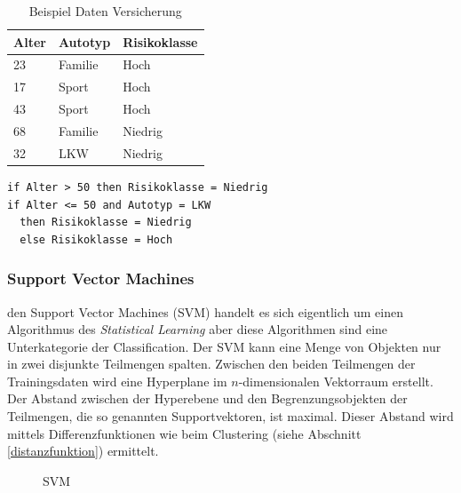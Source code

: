 \documentclass[12pt,journal,compsoc]{IEEEtran}
\begin{document}
\begin{table}[!t]
\caption{Beispiel Daten Versicherung}
\centering
\begin{tabular}{l|l|l}\hline
Alter	& Autotyp	& Risikoklasse \\\hline
23	& Familie	& Hoch\\
17	& Sport		& Hoch\\
43	& Sport		& Hoch\\
68	& Familie	& Niedrig\\
32	& LKW		& Niedrig
\end{tabular}
\label{trainingdata}
\end{table}
\begin{lstlisting}[caption={Entscheidungsbaum},label=dt,frame=single,floatplacement=t]
if Alter > 50 then Risikoklasse = Niedrig
if Alter <= 50 and Autotyp = LKW 
  then Risikoklasse = Niedrig
  else Risikoklasse = Hoch
\end{lstlisting}

\subsubsection{Support Vector Machines}
 den Support Vector Machines (SVM) handelt es sich eigentlich 
um einen Algorithmus des \emph{Statistical Learning} aber diese Algorithmen sind eine
Unterkategorie der Classification. Der SVM kann eine Menge von Objekten nur in zwei 
disjunkte Teilmengen spalten. Zwischen den beiden Teilmengen der Trainingsdaten wird 
eine Hyperplane im $n$-dimensionalen Vektorraum erstellt. Der Abstand zwischen der
Hyperebene und den Begrenzungsobjekten der Teilmengen, die so genannten Supportvektoren, 
ist maximal. Dieser Abstand wird mittels Differenzfunktionen wie beim Clustering 
(siehe Abschnitt \ref{distanzfunktion}) ermittelt.

\begin{figure}[!t]
\centering
\subfigure[Gesucht]{\scalebox{0.42}{}\label{hyperplane gesucht}}
\subfigure[Gefunden]{\scalebox{0.42}{}\label{hyperplane gefunden}}
\subfigure[Einordnung]{\scalebox{0.49}{}\label{einordnung}}
\caption{SVM}
\label{svm_pic}
\end{figure}
\end{document}
